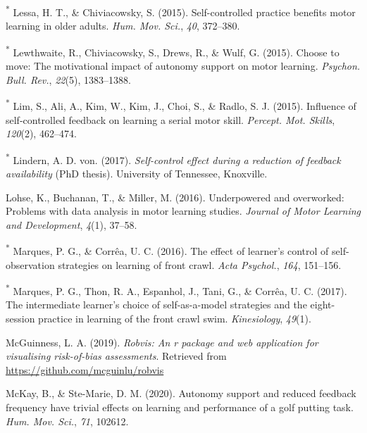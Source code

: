 \documentclass[
  english,
  man,floatsintext]{apa7}
\newlength{\cslhangindent}
\newlength{\cslentryspacingunit} %
\newenvironment{CSLReferences}[2] %
 {%
  \setlength{\parindent}{0pt}
  \ifodd #1
  \let\oldpar\par
  \def\par{\hangindent=\cslhangindent\oldpar}
  \fi
  \setlength{\parskip}{#2\cslentryspacingunit}
 }%
 {}
\begin{document}
\begin{CSLReferences}{1}{0}
\leavevmode{}%
\textsuperscript{*} Lessa, H. T., \& Chiviacowsky, S. (2015). Self-controlled practice benefits motor learning in older adults. \emph{Hum. Mov. Sci.}, \emph{40}, 372--380.

\leavevmode{}%
\textsuperscript{*} Lewthwaite, R., Chiviacowsky, S., Drews, R., \& Wulf, G. (2015). Choose to move: The motivational impact of autonomy support on motor learning. \emph{Psychon. Bull. Rev.}, \emph{22}(5), 1383--1388.

\leavevmode{}%
\textsuperscript{*} Lim, S., Ali, A., Kim, W., Kim, J., Choi, S., \& Radlo, S. J. (2015). Influence of self-controlled feedback on learning a serial motor skill. \emph{Percept. Mot. Skills}, \emph{120}(2), 462--474.

\leavevmode{}%
\textsuperscript{*} Lindern, A. D. von. (2017). \emph{Self-control effect during a reduction of feedback availability} (PhD thesis). University of Tennessee, Knoxville.

\leavevmode{}%
Lohse, K., Buchanan, T., \& Miller, M. (2016). Underpowered and overworked: Problems with data analysis in motor learning studies. \emph{Journal of Motor Learning and Development}, \emph{4}(1), 37--58.

\leavevmode{}%
\textsuperscript{*} Marques, P. G., \& Corrêa, U. C. (2016). The effect of learner's control of self-observation strategies on learning of front crawl. \emph{Acta Psychol.}, \emph{164}, 151--156.

\leavevmode{}%
\textsuperscript{*} Marques, P. G., Thon, R. A., Espanhol, J., Tani, G., \& Corrêa, U. C. (2017). The intermediate learner's choice of self-as-a-model strategies and the eight-session practice in learning of the front crawl swim. \emph{Kinesiology}, \emph{49}(1).

\leavevmode{}%
McGuinness, L. A. (2019). \emph{Robvis: An r package and web application for visualising risk-of-bias assessments}. Retrieved from \url{https://github.com/mcguinlu/robvis}

\leavevmode{}%
McKay, B., \& Ste-Marie, D. M. (2020). Autonomy support and reduced feedback frequency have trivial effects on learning and performance of a golf putting task. \emph{Hum. Mov. Sci.}, \emph{71}, 102612.


\end{CSLReferences}
\end{document}
